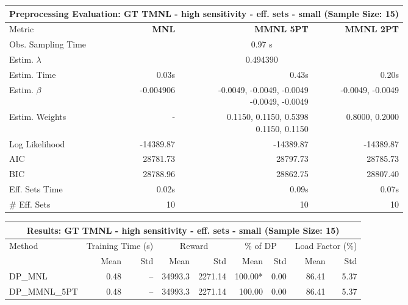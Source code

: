 
\begin{samepage}
\begin{center}
  \small
  \begin{tabular}{l|r|r|r}
    \toprule
    \multicolumn{4}{c}{\textbf{Preprocessing Evaluation: GT TMNL - high sensitivity - eff. sets - small (Sample Size: 15)}} \\
    \midrule
    Metric & \textbf{MNL} & \textbf{MMNL 5PT} & \textbf{MMNL 2PT} \\
    \midrule
    Obs. Sampling Time & \multicolumn{3}{c}{0.97 s} \\
    Estim. $\lambda$ & \multicolumn{3}{c}{0.494390} \\
    Estim. Time & 0.03s & 0.43s & 0.20s \\
    Estim. $\beta$ & -0.004906 & \makecell[tr]{-0.0049, -0.0049, -0.0049 \\ -0.0049, -0.0049} & -0.0049, -0.0049 \\
    Estim. Weights & - & \makecell[tr]{0.1150, 0.1150, 0.5398 \\ 0.1150, 0.1150} & 0.8000, 0.2000 \\
    Log Likelihood & -14389.87 & -14389.87 & -14389.87 \\
    AIC & 28781.73 & 28797.73 & 28785.73 \\
    BIC & 28788.96 & 28862.75 & 28807.40 \\
    Eff. Sets Time & 0.02s & 0.09s & 0.07s \\
    \# Eff. Sets & 10 & 10 & 10 \\
    \bottomrule
  \end{tabular}
\end{center}
\begin{center}
  \small
  \begin{tabular}{l|rr|rr|rr|rr}
    \toprule
    \multicolumn{9}{c}{\textbf{Results: GT TMNL - high sensitivity - eff. sets - small (Sample Size: 15)}} \\
    \midrule
    Method & \multicolumn{2}{c|}{Training Time (s)} & \multicolumn{2}{c|}{Reward} & \multicolumn{2}{c|}{\% of DP} & \multicolumn{2}{c}{Load Factor (\%)} \\
    & Mean & Std & Mean & Std & Mean & Std & Mean & Std \\
    \midrule
    DP\_MNL      &     0.48 &    -- &    34993.3 &    2271.14 & 100.00* &    0.00 &   86.41 &    5.37 \\
    DP\_MMNL\_5PT &     0.48 &    -- &    34993.3 &    2271.14 &  100.00 &    0.00 &   86.41 &    5.37 \\

\end{tabular}
\end{center}
\end{samepage}
